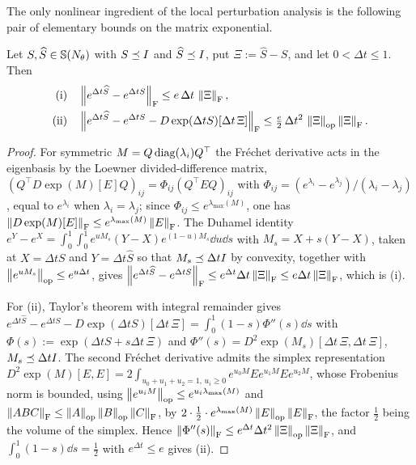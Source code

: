 The only nonlinear ingredient of the local perturbation analysis is the following pair of elementary
bounds on the matrix exponential.

\begin{lemma}
\label{lem:exp-perturb}
Let $S,\widehat S\in\mathbb{S}(N_\theta)$ with $S\preceq I$ and $\widehat S\preceq I$, put
$\Xi:=\widehat S-S$, and let $0<\Delta t\leq1$. Then
\begin{align*}
\textup{(i)}\quad & \left\lVert e^{\Delta t\widehat S}-e^{\Delta tS}\right\rVert_{\mathrm{F}}\leq e\,\Delta t\,\left\lVert \Xi\right\rVert_{\mathrm{F}},\\
\textup{(ii)}\quad & \left\lVert e^{\Delta t\widehat S}-e^{\Delta tS}-D\exp(\Delta tS)[\Delta t\,\Xi]\right\rVert_{\mathrm{F}}
\leq\tfrac e2\,\Delta t^2\,\left\lVert \Xi\right\rVert_{\mathrm{op}}\left\lVert \Xi\right\rVert_{\mathrm{F}}.
\end{align*}
\end{lemma}

\begin{proof}
For symmetric $M=Q\operatorname{diag}(\lambda_i)Q^\top$ the Fr\'echet derivative acts in the eigenbasis by the
Loewner divided-difference matrix,
$(Q^\top D\exp(M)[E]Q)_{ij}=\Phi_{ij}(Q^\top EQ)_{ij}$ with
$\Phi_{ij}=(e^{\lambda_i}-e^{\lambda_j})/(\lambda_i-\lambda_j)$, equal to $e^{\lambda_i}$ when
$\lambda_i=\lambda_j$; since $\Phi_{ij}\leq e^{\lambda_{\max}(M)}$, one has
$\left\lVert D\exp(M)[E]\right\rVert_{\mathrm{F}}\leq e^{\lambda_{\max}(M)}\left\lVert E\right\rVert_{\mathrm{F}}$. The Duhamel identity
$e^Y-e^X=\int_0^1\!\!\int_0^1e^{uM_s}(Y-X)e^{(1-u)M_s}\dd u\dd s$ with $M_s=X+s(Y-X)$, taken at
$X=\Delta tS$ and $Y=\Delta t\widehat S$ so that $M_s\preceq\Delta tI$ by convexity, together with
$\left\lVert e^{uM_s}\right\rVert_{\mathrm{op}}\leq e^{u\Delta t}$, gives
$\left\lVert e^{\Delta t\widehat S}-e^{\Delta tS}\right\rVert_{\mathrm{F}}\leq e^{\Delta t}\Delta t\left\lVert \Xi\right\rVert_{\mathrm{F}}\leq e\Delta t\left\lVert \Xi\right\rVert_{\mathrm{F}}$,
which is (i).

For (ii), Taylor's theorem with integral remainder gives
$e^{\Delta t\widehat S}-e^{\Delta tS}-D\exp(\Delta tS)[\Delta t\,\Xi]=\int_0^1(1-s)\Phi''(s)\dd s$ with
$\Phi(s):=\exp(\Delta tS+s\Delta t\,\Xi)$ and
$\Phi''(s)=D^2\exp(M_s)[\Delta t\,\Xi,\Delta t\,\Xi]$, $M_s\preceq\Delta tI$. The second Fr\'echet
derivative admits the simplex representation
$D^2\exp(M)[E,E]=2\int_{u_0+u_1+u_2=1,\,u_i\geq0}e^{u_0M}Ee^{u_1M}Ee^{u_2M}$, whose Frobenius norm is
bounded, using $\left\lVert e^{u_iM}\right\rVert_{\mathrm{op}}\leq e^{u_i\lambda_{\max}(M)}$ and
$\left\lVert ABC\right\rVert_{\mathrm{F}}\leq\left\lVert A\right\rVert_{\mathrm{op}}\left\lVert B\right\rVert_{\mathrm{op}}\left\lVert C\right\rVert_{\mathrm{F}}$, by
$2\cdot\tfrac12\cdot e^{\lambda_{\max}(M)}\left\lVert E\right\rVert_{\mathrm{op}}\left\lVert E\right\rVert_{\mathrm{F}}$, the factor $\tfrac12$ being the
volume of the simplex. Hence
$\left\lVert \Phi''(s)\right\rVert_{\mathrm{F}}\leq e^{\Delta t}\Delta t^2\left\lVert \Xi\right\rVert_{\mathrm{op}}\left\lVert \Xi\right\rVert_{\mathrm{F}}$, and
$\int_0^1(1-s)\dd s=\tfrac12$ with $e^{\Delta t}\leq e$ gives (ii).
\end{proof}

